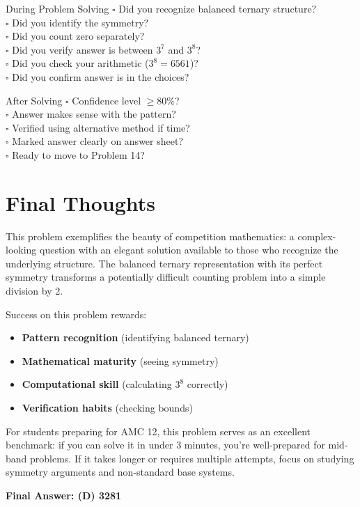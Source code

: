 \documentclass[12pt]{article}
\begin{document}
\begin{highlightbox}{During Problem Solving}
$\square$ Did you recognize balanced ternary structure?\\
$\square$ Did you identify the symmetry?\\
$\square$ Did you count zero separately?\\
$\square$ Did you verify answer is between $3^7$ and $3^8$?\\
$\square$ Did you check your arithmetic ($3^8 = 6561$)?\\
$\square$ Did you confirm answer is in the choices?
\end{highlightbox}

\begin{highlightbox}{After Solving}
$\square$ Confidence level $\geq 80\%$?\\
$\square$ Answer makes sense with the pattern?\\
$\square$ Verified using alternative method if time?\\
$\square$ Marked answer clearly on answer sheet?\\
$\square$ Ready to move to Problem 14?
\end{highlightbox}

\section*{Final Thoughts}

This problem exemplifies the beauty of competition mathematics: a complex-looking question with an elegant solution available to those who recognize the underlying structure. The balanced ternary representation with its perfect symmetry transforms a potentially difficult counting problem into a simple division by 2.

Success on this problem rewards:
\begin{itemize}
    \item \textbf{Pattern recognition} (identifying balanced ternary)
    \item \textbf{Mathematical maturity} (seeing symmetry)
    \item \textbf{Computational skill} (calculating $3^8$ correctly)
    \item \textbf{Verification habits} (checking bounds)
\end{itemize}

For students preparing for AMC 12, this problem serves as an excellent benchmark: if you can solve it in under 3 minutes, you're well-prepared for mid-band problems. If it takes longer or requires multiple attempts, focus on studying symmetry arguments and non-standard base systems.

\vspace{1em}
\noindent\textbf{Final Answer: (D) 3281}
\end{document}
